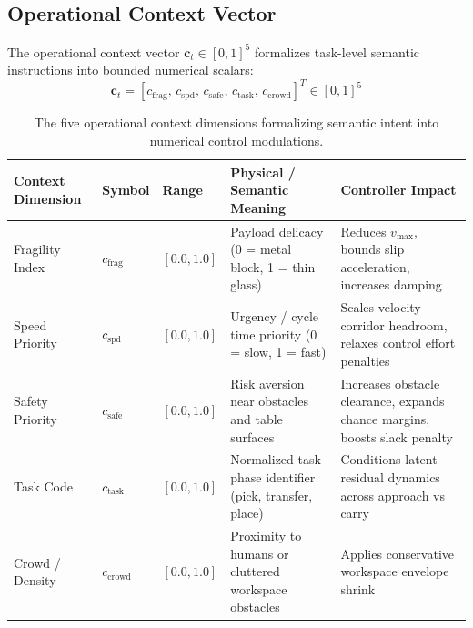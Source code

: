 \documentclass[10pt,a4paper]{article}
\begin{document}
\subsection{Operational Context Vector}
The operational context vector $\mathbf{c}_t \in [0, 1]^5$ formalizes task-level semantic instructions into bounded numerical scalars:
\begin{equation}
\mathbf{c}_t = [c_{\mathrm{frag}}, \, c_{\mathrm{spd}}, \, c_{\mathrm{safe}}, \, c_{\mathrm{task}}, \, c_{\mathrm{crowd}}]^T \in [0, 1]^5
\label{eq:context_vector}
\end{equation}

\begin{table}[h]
\centering
\small
\begin{tabularx}{\linewidth}{p{2.6cm}p{1.4cm}p{1.6cm}p{4.2cm}X}
\toprule
\textbf{Context Dimension} & \textbf{Symbol} & \textbf{Range} & \textbf{Physical / Semantic Meaning} & \textbf{Controller Impact} \\
\midrule
Fragility Index & $c_{\mathrm{frag}}$ & $[0.0, 1.0]$ & Payload delicacy (0 = metal block, 1 = thin glass) & Reduces $v_{\mathrm{max}}$, bounds slip acceleration, increases damping \\
Speed Priority & $c_{\mathrm{spd}}$ & $[0.0, 1.0]$ & Urgency / cycle time priority (0 = slow, 1 = fast) & Scales velocity corridor headroom, relaxes control effort penalties \\
Safety Priority & $c_{\mathrm{safe}}$ & $[0.0, 1.0]$ & Risk aversion near obstacles and table surfaces & Increases obstacle clearance, expands chance margins, boosts slack penalty \\
Task Code & $c_{\mathrm{task}}$ & $[0.0, 1.0]$ & Normalized task phase identifier (pick, transfer, place) & Conditions latent residual dynamics across approach vs carry \\
Crowd / Density & $c_{\mathrm{crowd}}$ & $[0.0, 1.0]$ & Proximity to humans or cluttered workspace obstacles & Applies conservative workspace envelope shrink \\
\bottomrule
\end{tabularx}
\caption{The five operational context dimensions formalizing semantic intent into numerical control modulations.}
\label{tab:context_dimensions}
\end{table}
\end{document}
